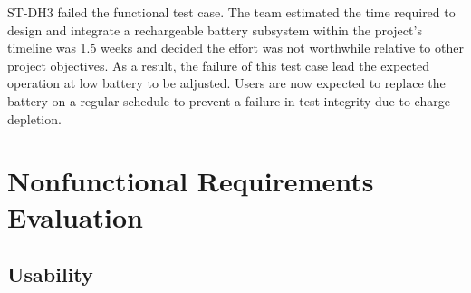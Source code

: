 \documentclass[12pt, titlepage]{article}
\begin{document}
  ST-DH3 failed the functional test case. The team estimated the time required to design and integrate a rechargeable battery subsystem within the project's timeline was 1.5 weeks and decided the effort was not worthwhile relative to other project objectives. As a result, the failure of this test case lead the expected operation at low battery to be adjusted. Users are now expected to replace the battery on a regular schedule to prevent a failure in test integrity due to charge depletion. \\

\section{Nonfunctional Requirements Evaluation}
\subsection{Usability}
\newpage
\end{document}

